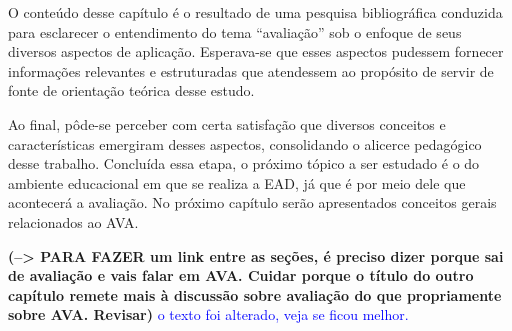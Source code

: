 O conteúdo desse capítulo é o resultado de uma pesquisa bibliográfica conduzida para esclarecer o entendimento do tema ``avaliação'' sob o enfoque de seus diversos aspectos de aplicação. Esperava-se que esses aspectos pudessem fornecer informações relevantes e estruturadas que atendessem ao propósito de servir de fonte de orientação teórica desse estudo. 

Ao final, pôde-se perceber com certa satisfação que diversos conceitos e características emergiram desses aspectos, consolidando o alicerce pedagógico desse trabalho. Concluída essa etapa, o próximo tópico a ser estudado é o do ambiente educacional em que se realiza a EAD, já que é por meio dele que acontecerá a avaliação. No próximo capítulo serão apresentados conceitos gerais relacionados ao AVA. 

\textbf{(--> PARA FAZER um link entre as seções, é preciso dizer porque sai de avaliação e vais falar em AVA. Cuidar porque o título do outro capítulo remete mais à discussão sobre avaliação do que propriamente sobre AVA. Revisar)} \textcolor{blue}{o texto foi alterado, veja se ficou melhor.}
